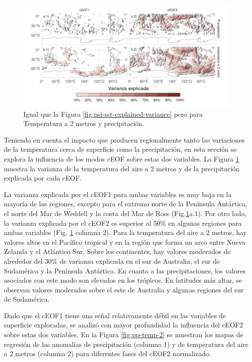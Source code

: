 \documentclass[12pt,oneside,a4paper]{reedthesis}
\begin{document}
\begin{figure}

{\centering \includegraphics{figures/20-ceofs/pp-t2m-r2-1} 

}

\caption{Igual que la Figura \ref{fig:psi-sst-explained-variance} pero para Temperatura a 2 metros y precipitación.}\label{fig:pp-t2m-r2}
\end{figure}



Teniendo en cuenta el impacto que producen regionalmente tanto las variaciones de la temperatura cerca de superficie como la precipitación, en esta sección se explora la influencia de los modos cEOF sobre estas dos variables.
La Figura \ref{fig:pp-t2m-r2} muestra la varianza de la temperatura del aire a 2 metros y de la precipitación explicada por cada cEOF.

La varianza explicada por el cEOF1 para ambas variables es muy baja en la mayoría de las regiones, excepto para el extremo norte de la Península Antártica, el norte del Mar de Weddell y la costa del Mar de Ross (Fig.\ref{fig:pp-t2m-r2}a.1).
Por otro lado, la varianza explicada por el cEOF2 es superior al 50\% en algunas regiones para ambas variables (Fig. \ref{fig:pp-t2m-r2} columna 2).
Para la temperatura del aire a 2 metros, hay valores altos en el Pacífico tropical y en la región que forma un arco entre Nueva Zelanda y el Atlántico Sur.
Sobre los continentes, hay valores moderados de alrededor del 30\% de varianza explicada en el sur de Australia, el sur de Sudamérica y la Península Antártica.
En cuanto a las precipitaciones, los valores asociados con este modo son elevados en los trópicos.
En latitudes más altas, se observan valores moderados sobre el este de Australia y algunas regiones del sur de Sudamérica.

Dado que el cEOF1 tiene una señal relativamente débil en las variables de superficie exploradas, se analizó con mayor profundidad la influencia del cEOF2 sobre estas dos variables.
En la Figura \ref{fig:pp-temp-2} se muestran los mapas de regresión de las anomalías de precipitación (columna 1) y de temperatura del aire a 2 metros (columna 2) para diferentes fases del cEOF2 normalizado.
\end{document}
